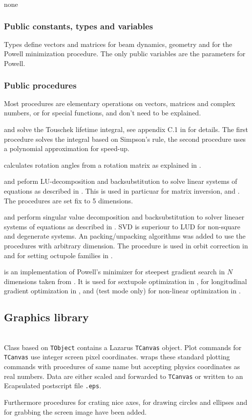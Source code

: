 \documentclass[12pt]{article}
\newcommand\code[1]{{\tt #1}}
\newcommand\guifco[1]{{\color{violet}\code{#1}}}
\newcommand{\unico}[1]{{\color{burntorange}\code{#1}}}
\newcommand{\opagui}[1]{\colorbox{blue!20}{{\color{black}\code{#1}}}}
\newcommand{\ogui}[1]{\hyperref[#1]{\opagui{#1}}}
\newcommand{\opaguif}[1]{\colorbox{violet!30}{{\color{black}\code{#1}}}}
\newcommand{\oguifh}[2]{\subsection{\label{#2}#1}{\Huge\opaguif{#2}}\\}
\newcommand{\oguif}[1]{\hyperref[#1]{\opaguif{#1}}}
\newcommand{\uses}[1]{\flushleft {\bf Uses:} #1}
\newcommand{\desc}[1]{#1}
\newcommand{\pvar}[1]{\subsubsection*{Public constants, types and variables} #1}
\newcommand{\ppro}[1]{\subsubsection*{Public procedures} #1}
\begin{document}
\uses{none}

\pvar{
Types define vectors and matrices for beam dynamics, geometry and for the Powell minimization procedure. The only public variables are the parameters for Powell. 
}

\ppro{
Most procedures are elementary operations on vectors, matrices and complex numbers, or for special functions, and don't need to be explained.

\unico{CTouschek} and \unico{CTouschek\_pol} solve the Touschek lifetime integral, see appendix C.1 in \cite{inside} for details. The first procedure solves the integral based on Simpson's rule, the second procedure uses a polynomial approximation for speed-up. 

\unico{EulerAng} calculates rotation angles from a rotation matrix as explained in \cite{euler}.

\unico{LUDCMP} and \unico{LUBKSB} peform LU-decomposition and backsubstitution to solve linear systems of equations as described in \cite{numrec}. This is used in particuar for matrix inversion, \unico{MatInv} and \unico{MatDet}. The procedures are set fix to 5 dimensions.


\unico{svdcmp} and \unico{svbksb} perform singular value decomposition and backsubstitution to solver lineaer systems of equations as described in \cite{numrec}. SVD is superiour to LUD for non-square and degenerate systems. An packing/unpacking algorithms was added to use the procedures with arbitrary dimension. The procedure is used in orbit correction in \ogui{opaorbit} and for setting octupole families in \ogui{opachroma}.

\unico{Powell} is an implementation of Powell's minimizer for steepest gradient search in $N$ dimensions taken from \cite{numrec}. It is used for sextupole optimization in \ogui{opachroma}, for longitudinal gradient optimization in \ogui{opalgbedit}, and (test mode only) for non-linear optimization in \ogui{opamomentum}.
}

\oguifh{Graphics library}{../com/vgraph}

\desc{
Class \guifco{Vplot} based on \code{TObject} contains a Lazarus \code{TCanvas} object. Plot commands for \code{TCanvas}  use integer screen pixel coordinates. \oguif{../com/vgraph} wraps these standard plotting commands with procedures of same name but accepting physics coordinates as real numbers. Data are either scaled and forwarded to \code{TCanvas}  or written to an Ecapsulated postscript file \code{*.eps}.

Furthermore procedures for crating nice axes, for drawing circles and ellipses and for grabbing the screen image have been added.
}
\end{document}
